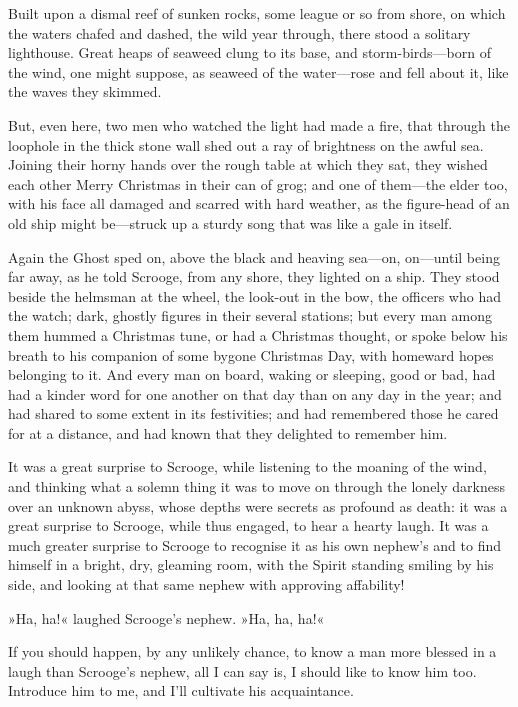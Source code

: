 Built upon a dismal reef of sunken rocks, some league or so from shore, on which the waters chafed and dashed, the wild year through, there stood a solitary lighthouse. Great heaps of seaweed clung to its base, and storm-birds---born of the wind, one might suppose, as seaweed of the water---rose and fell about it, like the waves they skimmed.

But, even here, two men who watched the light had made a fire, that through the loophole in the thick stone wall shed out a ray of brightness on the awful sea. Joining their horny hands over the rough table at which they sat, they wished each other Merry Christmas in their can of grog; and one of them---the elder too, with his face all damaged and scarred with hard weather, as the figure-head of an old ship might be---struck up a sturdy song that was like a gale in itself.

Again the Ghost sped on, above the black and heaving sea---on, on---until being far away, as he told Scrooge, from any shore, they lighted on a ship. They stood beside the helmsman at the wheel, the look-out in the bow, the officers who had the watch; dark, ghostly figures in their several stations; but every man among them hummed a Christmas tune, or had a Christmas thought, or spoke below his breath to his companion of some bygone Christmas Day, with homeward hopes belonging to it. And every man on board, waking or sleeping, good or bad, had had a kinder word for one another on that day than on any day in the year; and had shared to some extent in its festivities; and had remembered those he cared for at a distance, and had known that they delighted to remember him.

It was a great surprise to Scrooge, while listening to the moaning of the wind, and thinking what a solemn thing it was to move on through the lonely darkness over an unknown abyss, whose depths were secrets as profound as death: it was a great surprise to Scrooge, while thus engaged, to hear a hearty laugh. It was a much greater surprise to Scrooge to recognise it as his own  nephew's and to find himself in a bright, dry, gleaming room, with the Spirit standing smiling by his side, and looking at that same nephew with approving affability!

»Ha, ha!« laughed Scrooge's nephew. »Ha, ha, ha!«

If you should happen, by any unlikely chance, to know a man more blessed in a laugh than Scrooge's nephew, all I can say is, I should like to know him too. Introduce him to me, and I'll cultivate his acquaintance.

